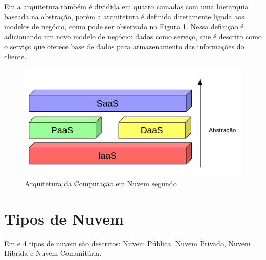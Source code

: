 Em \citep{demystifingCloud:2011} a arquitetura também é dividida em quatro camadas com uma hierarquia baseada na abstração, porém a arquitetura é definida diretamente ligada aos modelos de negócio, como pode ser observado na Figura \ref{architecture2}. Nessa definição é adicionando um novo modelo de negócio: dados como serviço, que é descrito como o serviço que oferece base de dados para armazenamento das informações do cliente. 

\begin{figure}[htbp]
  \centering \includegraphics[scale=.6]{imgs/architecture2.png}
\caption{Arquitetura da Computação em Nuvem segundo \citep{demystifingCloud:2011}} 
\label{architecture2}
\end{figure}

\section{Tipos de Nuvem}

	Em \citep{stateOfArt:2010} e \cite{NIST:2011} 4 tipos de nuvem são descritos: Nuvem Pública, Nuvem Privada, Nuvem Híbrida e Nuvem Comunitária.

